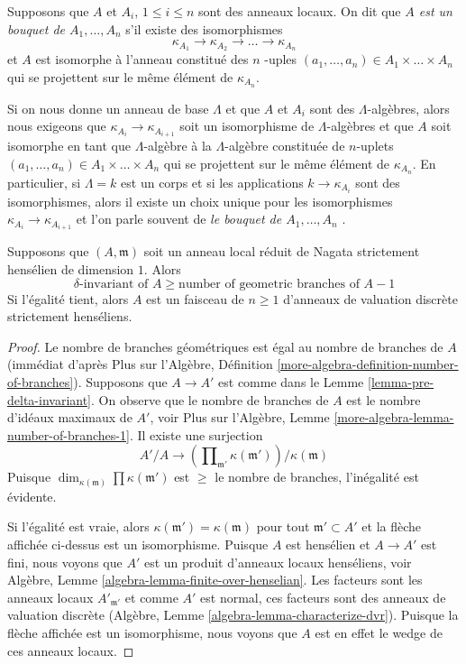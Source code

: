 \begin{definition}
\label{definition-wedge}
Supposons que $A$ et $A_i$, $1 \leq i \leq n$ sont
des anneaux locaux. On dit que {\it $A$ est un bouquet
de $A_1, \ldots, A_n$ } s'il existe des isomorphismes
$$
\kappa_{A_1} \to \kappa_{A_2} \to \ldots \to \kappa_{A_n}
$$
et $A$ est isomorphe à l'anneau constitué des $n$ -uples
$(a_1, \ldots, a_n) \in A_1 \times \ldots \times A_n$
qui se projettent sur le même élément de $\kappa_{A_n}$.
\end{definition}

\noindent
Si on nous donne un anneau de base $\Lambda$ et que $A$ et
$A_i$ sont des $\Lambda$-algèbres, alors nous exigeons que
$\kappa_{A_i} \to \kappa_{A_{i + 1}}$ soit un isomorphisme de
$\Lambda$-algèbres et que $A$ soit isomorphe en tant que
$\Lambda$-algèbre à la $\Lambda$-algèbre constituée de
$n$-uplets $(a_1, \ldots, a_n) \in A_1 \times \ldots \times A_n$
qui se projettent sur le même élément de $\kappa_{A_n}$. En
particulier, si $\Lambda = k$ est un corps et si les applications
$k \to \kappa_{A_i}$ sont des isomorphismes, alors il existe un
choix unique pour les isomorphismes $\kappa_{A_i} \to \kappa_{A_{i +
1}}$ et l'on parle souvent de {\it le bouquet de $A_1, \ldots, A_n$ }.

\begin{lemma}
\label{lemma-delta-number-branches-inequality-sh}
Supposons que $(A, \mathfrak m)$ soit un anneau local
réduit de Nagata strictement hensélien de dimension $1$. Alors
$$
\delta\text{-invariant of }A \geq \text{number of geometric branches of }A - 1
$$
Si l'égalité tient, alors $A$ est un faisceau de $n \geq
1$ d'anneaux de valuation discrète strictement henséliens.
\end{lemma}

\begin{proof}
Le nombre de branches géométriques est égal au nombre
de branches de $A$ (immédiat d'après Plus sur
l'Algèbre, Définition
\ref{more-algebra-definition-number-of-branches}). Supposons que
$A \to A'$ est comme dans le Lemme
\ref{lemma-pre-delta-invariant}. On observe que le nombre de branches de
$A$ est le nombre d'idéaux maximaux de $A'$, voir Plus sur l'Algèbre,
Lemme \ref{more-algebra-lemma-number-of-branches-1}. Il existe une surjection
$$
A'/A \longrightarrow
\left(\prod\nolimits_{\mathfrak m'} \kappa(\mathfrak m')\right)/
\kappa(\mathfrak m)
$$
Puisque $\dim_{\kappa(\mathfrak m)} \prod \kappa(\mathfrak
m')$ est $\geq$ le nombre de branches, l'inégalité est évidente.

\medskip\noindent
Si l'égalité est vraie, alors $\kappa(\mathfrak m') =
\kappa(\mathfrak m)$ pour tout $\mathfrak m' \subset A'$ et la
flèche affichée ci-dessus est un isomorphisme. Puisque $A$ est
hensélien et $A \to A'$ est fini, nous voyons que $A'$ est un
produit d'anneaux locaux henséliens, voir Algèbre, Lemme
\ref{algebra-lemma-finite-over-henselian}. Les facteurs sont les
anneaux locaux $A'_{\mathfrak m'}$ et comme $A'$ est normal, ces
facteurs sont des anneaux de valuation discrète (Algèbre, Lemme
\ref{algebra-lemma-characterize-dvr}). Puisque la flèche affichée est un
isomorphisme, nous voyons que $A$ est en effet le wedge de ces anneaux locaux.
\end{proof}

